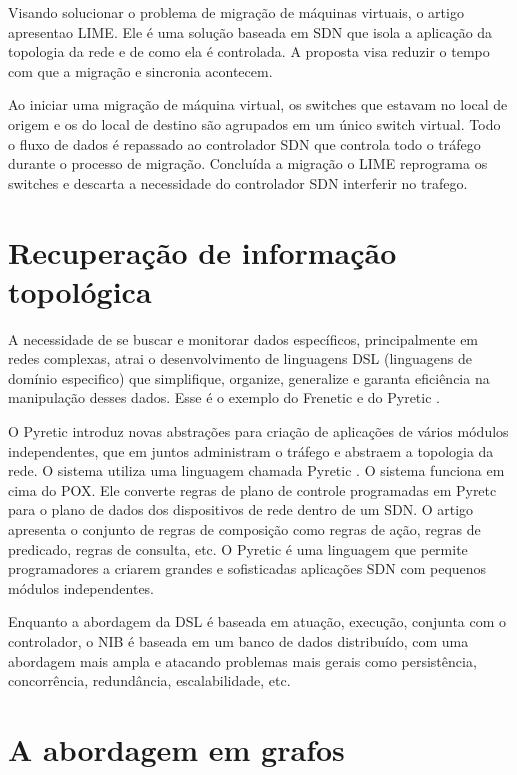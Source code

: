 Visando solucionar o problema de migração de máquinas virtuais, 
o artigo \citep{erik2012live} apresentao LIME.
Ele é uma solução baseada em SDN que isola a aplicação da topologia da rede e 
de como ela é controlada. 
A proposta visa reduzir o tempo com que a migração e sincronia acontecem.

Ao iniciar uma migração de máquina virtual, os switches que estavam no local 
de origem e os do local de destino são agrupados em um único switch virtual. 
Todo o fluxo de dados é repassado ao controlador SDN que controla todo o 
tráfego durante o processo de migração. 
Concluída a migração o LIME reprograma os switches e descarta a necessidade 
do controlador SDN interferir no trafego.

\section{Recuperação de informação topológica}

A necessidade de se buscar e monitorar dados 
específicos, principalmente em redes complexas, atrai o desenvolvimento
de linguagens DSL (linguagens de domínio especifico) que simplifique, 
organize, generalize e garanta eficiência na manipulação desses dados.
Esse é o exemplo do Frenetic \citep{foster2011frenetic} 
e do Pyretic \citep{monsanto2013composing}.

O Pyretic introduz novas abstrações para criação de aplicações de vários
módulos independentes, que em juntos administram o tráfego e 
abstraem a topologia da rede. 
O sistema utiliza uma linguagem chamada Pyretic \citep{monsanto2013composing}. 
O sistema funciona em cima do POX. 
Ele converte regras de plano de controle programadas em Pyretc para o plano 
de dados dos dispositivos de rede dentro de um SDN. 
O artigo apresenta o conjunto de regras de composição como regras de ação, 
regras de predicado, regras de consulta, etc. 
O Pyretic é uma linguagem que permite programadores a criarem grandes e 
sofisticadas aplicações SDN com pequenos módulos independentes. 

Enquanto a abordagem da DSL é baseada em atuação, execução,
conjunta com o controlador,
o NIB é baseada em um banco de dados distribuído,
com uma abordagem mais ampla e atacando problemas mais gerais
como persistência, concorrência, redundância, escalabilidade, etc.

\section{A abordagem em grafos}

